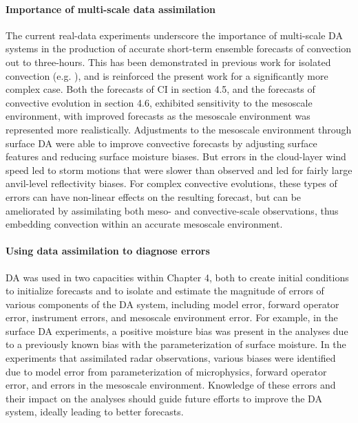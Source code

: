 \paragraph{Importance of multi-scale data assimilation}
The current real-data experiments underscore the importance of multi-scale DA systems in the production of accurate short-term ensemble forecasts of convection out to three-hours. This has been demonstrated in previous work for isolated convection (e.g. \citealt{stensrudgao10}), and is reinforced the present work for a significantly more complex case. Both the forecasts of CI in section 4.5, and the forecasts of convective evolution in section 4.6, exhibited sensitivity to the mesoscale environment, with improved forecasts as the mesoscale environment was represented more realistically. Adjustments to the mesoscale environment through surface DA were able to improve convective forecasts by adjusting surface features and reducing surface moisture biases. But errors in the cloud-layer wind speed led to storm motions that were slower than observed and led for fairly large anvil-level reflectivity biases. For complex convective evolutions, these types of errors can have non-linear effects on the resulting forecast, but can be ameliorated by assimilating both meso- and convective-scale observations, thus embedding convection within an accurate mesoscale environment.

\paragraph{Using data assimilation to diagnose errors}
DA was used in two capacities within Chapter 4, both to create initial conditions to initialize forecasts and to isolate and estimate the magnitude of errors of various components of the DA system, including model error, forward operator error, instrument errors, and mesoscale environment error. For example, in the surface DA experiments, a positive moisture bias was present in the analyses due to a previously known bias with the parameterization of surface moisture. In the experiments that assimilated radar observations, various biases were identified due to model error from parameterization of microphysics, forward operator error, and errors in the mesoscale environment. Knowledge of these errors and their impact on the analyses should guide future efforts to improve the DA system, ideally leading to better forecasts.

